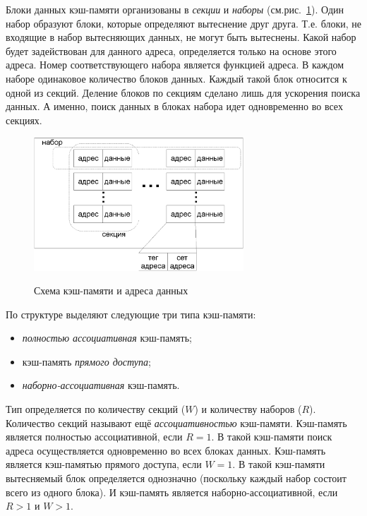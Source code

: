 Блоки данных кэш-памяти организованы в \emph{секции} и \emph{наборы} (см.рис.~\ref{fig:cache_model}). Один набор образуют блоки, которые определяют вытеснение друг друга. Т.е. блоки, не входящие в набор вытесняющих данных, не могут быть вытеснены. Какой набор будет задействован для данного адреса, определяется только на основе этого адреса. Номер соответствующего набора является функцией адреса. В каждом наборе одинаковое количество блоков данных. Каждый такой блок относится к одной из секций. Деление блоков по секциям сделано лишь для ускорения поиска данных. А именно, поиск данных в блоках набора идет одновременно во всех секциях.

\begin{figure}[h] \center
  \includegraphics[width=0.7\textwidth]{1.review/cache}\\
  \caption{Схема кэш-памяти и адреса данных}\label{fig:cache_model}
\end{figure}

По структуре выделяют следующие три типа кэш-памяти:
\begin{itemize}
   \item \emph{полностью ассоциативная} кэш-память;
   \item кэш-память \emph{прямого доступа};
   \item \emph{наборно-ассоциативная} кэш-память.
\end{itemize}
Тип определяется по количеству секций ($W$) и количеству наборов ($R$). Количество секций называют ещё \emph{ассоциативностью} кэш-памяти. Кэш-память является полностью ассоциативной, если $R = 1$. В такой кэш-памяти поиск адреса осуществляется одновременно во всех блоках данных. Кэш-память является кэш-памятью прямого доступа, если $W = 1$. В такой кэш-памяти вытесняемый блок определяется однозначно (поскольку каждый набор состоит всего из одного блока). И кэш-память является наборно-ассоциативной, если $R > 1$ и $W > 1$.


